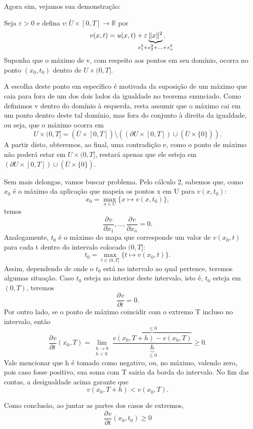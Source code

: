 \documentclass[../pde_notes.tex]{subfiles}
\begin{document}
Agora sim, vejamos sua demonstração:
\begin{proof*}
	Seja \(\varepsilon > 0\) e defina \(v:\overline{U}\times [0, T]\rightarrow \mathbb{R}\) por
	\[
		v(x, t)=u(x, t) + \varepsilon \underbrace{\Vert x \Vert^{2}}_{\mathclap{x_{1}^{2}+x_{2}^{2}+\dotsc +x_{n}^{2}}}.
	\]
	Suponha que o máximo de v, com respeito aos pontos em seu domínio, ocorra no ponto \((x_{0}, t_{0})\) dentro de \(U\times (0, T]\).

	A escolha deste ponto em específico é motivada da suposição de um máximo que caia para fora de um dos dois lados da igualdade no teorema enunciado.
	Como definimos v dentro do domínio à esquerda, resta assumir que o máximo cai em um ponto dentro deste tal domínio, mas fora do conjunto à direita da igualdade,
	ou seja, que o máximo ocorra em
	\[
		U\times (0, T] = (\overline{U}\times [0, T])\setminus{((\partial U \times [0, T]) \cup (\overline{U}\times \{0\}))}.
	\]
	A partir disto, obteremos, ao final, uma contradição e, como o ponto de máximo não poderá estar em \(U\times (0, T]\), restará apenas que ele esteja em \((\partial U \times [0, T]) \cup (\overline{U}\times \{0\})\).

	Sem mais delongas, vamos buscar problema. Pelo cálculo 2, sabemos que, como \(x_{0}\) é o máximo da aplicação que mapeia os pontos x em U para \(v(x, t_{0})\):
	\[
		x_{0}=\max_{x\in U}\{x\mapsto v(x, t_{0})\},
	\]
	temos
	\[
		\frac{\partial^{}v}{\partial x_1{}}, \dotsc , \frac{\partial^{}v}{\partial x_{n}^{}}=0.
	\]
	Analogamente, \(t_{0}\) é o máximo do mapa que corresponde um valor de \(v(x_{0}, t)\) para cada t dentro do intervalo colocado \((0, T]\):
	\[
		t_{0}= \max_{t\in (0, T]}\{t\mapsto v(x_{0}, t)\}.
	\]
	Assim, dependendo de onde o \(t_{0}\) está no intervalo ao qual pertence, teremos algumas situação. Caso \(t_{0}\) esteja no interior deste intervalo, isto é, \(t_{0}\) esteja em \((0, T)\), teremos
	\[
		\frac{\partial^{}v}{\partial t^{}}=0.
	\]
	Por outro lado, se o ponto de máximo coincidir com o extremo T incluso no intervalo, então
	\[
		\frac{\partial^{}v}{\partial t^{}}(x_{0}, T)=\lim_{\substack{h\to 0\\ h<0}} \frac{\overbrace{v(x_{0}, T+h) - v(x_{0}, T)}^{\leq 0}}{\underbrace{h}_{\leq 0}} \geq 0.
	\]
	Vale mencionar que h é tomado como negativo, ou, no máximo, valendo zero, pois caso fosse positivo, sua soma com T sairia da borda do intervalo. No fim das contas, a desigualdade acima garante que
	\[
		v(x_{0}, T+h) < v(x_{0}, T).
	\]

	Como conclusão, ao juntar as partes dos casos de extremos,
	\[
		\frac{\partial^{}v}{\partial t^{}}(x_{0}, t_{0})\geq 0
	\]


\end{proof*}
\end{document}
